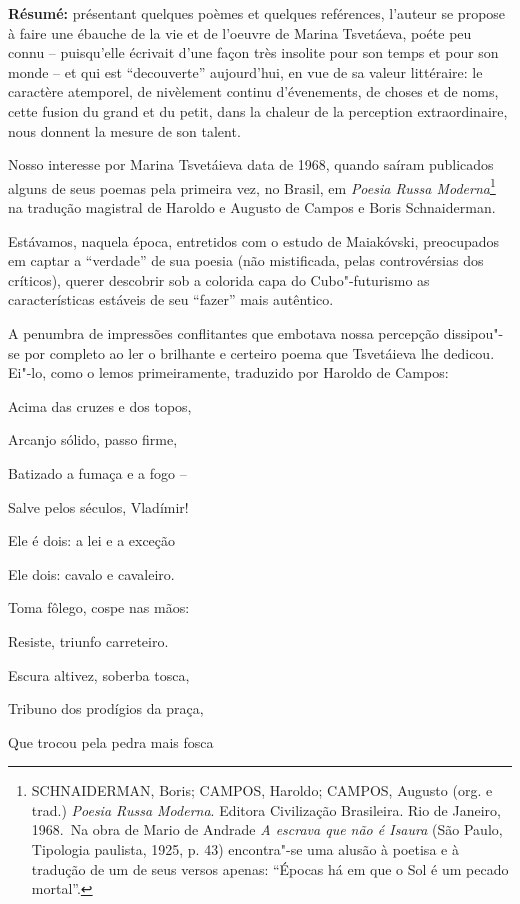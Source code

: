 \textbf{Résumé:} présentant quelques poèmes et quelques reférences,
l'auteur se propose à faire une ébauche de la vie et de l'oeuvre de
Marina Tsvetáeva, poéte peu connu -- puisqu'elle écrivait d'une façon
très insolite pour son temps et pour son monde -- et qui est
``decouverte'' aujourd'hui, en vue de sa valeur littéraire: le caractère
atemporel, de nivèlement continu d'évenements, de choses et de noms,
cette fusion du grand et du petit, dans la chaleur de la perception
extraordinaire, nous donnent la mesure de son talent.

Nosso interesse por Marina Tsvetáieva data de 1968, quando saíram
publicados alguns de seus poemas pela primeira vez, no Brasil, em
\emph{Poesia Russa Moderna}\footnote{SCHNAIDERMAN, Boris; CAMPOS,
  Haroldo; CAMPOS, Augusto (org. e trad.) \emph{Poesia Russa Moderna}.
  Editora Civilização Brasileira. Rio de Janeiro, 1968.~Na obra de Mario
  de Andrade \emph{A escrava que não é Isaura} (São Paulo, Tipologia
  paulista, 1925, p. 43) encontra"-se uma alusão à poetisa e à tradução
  de um de seus versos apenas: ``Épocas há em que o Sol é um pecado
  mortal''.} na tradução magistral de Haroldo e Augusto de Campos e
Boris Schnaiderman.

Estávamos, naquela época, entretidos com o estudo de Maiakóvski,
preocupados em captar a ``verdade'' de sua poesia (não mistificada,
pelas controvérsias dos críticos), querer descobrir sob a colorida capa
do Cubo"-futurismo as características estáveis de seu ``fazer'' mais
autêntico.

A penumbra de impressões conflitantes que embotava nossa percepção
dissipou"-se por completo ao ler o brilhante e certeiro poema que
Tsvetáieva lhe dedicou. Ei"-lo, como o lemos primeiramente, traduzido por
Haroldo de Campos:

Acima das cruzes e dos topos,

Arcanjo sólido, passo firme,

Batizado a fumaça e a fogo --

Salve pelos séculos, Vladímir!

Ele é dois: a lei e a exceção

Ele dois: cavalo e cavaleiro.

Toma fôlego, cospe nas mãos:

Resiste, triunfo carreteiro.

Escura altivez, soberba tosca,

Tribuno dos prodígios da praça,

Que trocou pela pedra mais fosca

